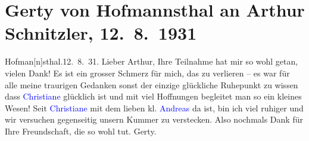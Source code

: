 

               \section[Gerty von Hofmannsthal an Arthur Schnitzler, 12. 8. 1931]{ Gerty von Hofmannsthal an Arthur Schnitzler, 12. 8. 1931}\nopagebreak{}\rehead{ }\normalsize\beginnumbering{} \toendnotes[C]{\smallbreak\pagebreak[2]} 
\toendnotes[C]{\smallbreak}\pstart
           \noindent{}{\pb}Hofman{[}n{]}sthal.\hfill 12. 8. 31.\pend
           \pstart
           Lieber Arthur, Ihre Teilnahme hat mir so wohl getan, vielen
                    Dank! Es ist ein grosser Schmerz für mich, das \label{K_L02545_1v}\label{K_L02545_1h} zu verlieren – es war für alle meine
                    traurigen Gedanken sonst der einzige glückliche Ruhepunkt zu wissen dass \textcolor{blue}{Christiane}{}\ledrightnote{\textcolor{blue}{Christiane von Hofmannsthal}} glücklich ist und mit viel
                    Hoffnungen begleitet man so ein kleines Wesen! Seit \textcolor{blue}{Christiane}{}\ledrightnote{\textcolor{blue}{Christiane von Hofmannsthal}} mit dem lieben kl. \textcolor{blue}{Andreas}{}\ledrightnote{\textcolor{blue}{Andreas Zimmer}} da ist, bin ich viel ruhiger und wir versuchen
                    gegenseitig unsern Kummer zu verstecken. Also nochmals Dank für Ihre
                    Freundschaft, die so wohl tut.\pend
           \pstart \spacefill\mbox{Gerty.}\pend{}\endnumbering{}  
      
